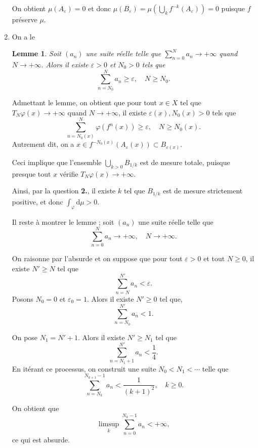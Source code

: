 \documentclass[a4paper,12pt,openany]{article}
\theoremstyle{plain}
\newtheorem{lem}{Lemme}
\theoremstyle{definition}
\newcommand{\dd}{\mathrm{d}}
\begin{document}
\begin{enumerate}
On obtient $\mu(A_\varepsilon) = 0$ et donc $\mu(B_\varepsilon) = \mu \left(\bigcup_{k}f^{-k}(A_\varepsilon)\right) = 0$ puisque $f$ pr\'eserve $\mu$. 
\item On a le 
\begin{lem}
Soit $(a_n)$ une suite r\'eelle telle que $\sum_{n=0}^N a_n \to +\infty$ quand $N \to +\infty.$ Alors il existe $\varepsilon > 0$ et $N_0 > 0$ tels que 
$$
\sum_{n=N_0}^N a_n \geqslant \varepsilon, \quad N \geqslant N_0.
$$
\end{lem}
Admettant le lemme, on obtient que pour tout $x \in X$ tel que $T_N \varphi(x) \to +\infty$ quand $N \to +\infty$, il existe $\varepsilon(x), N_0(x) > 0$ tels que 
$$
\sum_{n=N_0(x)}^{N} \varphi(f^n(x)) \geqslant \varepsilon, \quad N \geqslant N_0(x).
$$
 Autrement dit, on a $x \in f^{-N_0(x)}(A_\varepsilon(x)) \subset B_{\varepsilon(x)}.$  





Ceci implique que l'ensemble 
$
\displaystyle{
\bigcup_{k > 0} B_{1/k}
}
$
est de mesure totale, puisque presque tout $x$ v\'erifie $T_N\varphi(x) \to +\infty$.  

Ainsi, par la question \textbf{2.}, il existe $k$ tel que $B_{1/k}$ est de mesure strictement positive, et donc $\int_\varphi \dd \mu > 0.$  

Il reste \`a montrer le lemme ; soit $(a_n)$ une suite r\'eelle telle que 
$$
\sum_{n=0}^N a_n \to +\infty, \quad N \to +\infty.
$$

On raisonne par l'absurde et on suppose que pour tout $\varepsilon > 0$ et tout $N \geqslant 0$, il existe $N' \geqslant N$ tel que 
$$
\sum_{n=N}^{N'} a_n < \varepsilon.
$$
 Posons $N_0 = 0$ et $\varepsilon_0 = 1.$ Alors il existe $N' \geqslant 0$ tel que, 
$$
\sum_{n=N_0}^{N'} a_n < 1.
$$

On pose $N_1 = N' + 1$. Alors il existe $N' \geqslant N_1$ tel que 
$$
\sum_{n=N_1 + 1}^{N'} a_n < \frac{1}{4}.
$$
 En it\'erant ce processus, on construit une suite $N_0 < N_1 < \cdots$ telle que
$$
\sum_{n=N_k}^{N_{k+1}-1} a_n < \frac{1}{(k+1)^2}, \quad k \geqslant 0.
$$

On obtient que 
$$
\limsup_k \sum_{n=0}^{N_k-1} a_n < +\infty,
$$
ce qui est absurde.
\end{enumerate}
\vspace{0.6cm}
\end{document}
